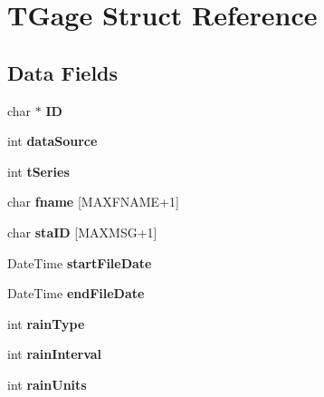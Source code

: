 \hypertarget{struct_t_gage}{}\section{T\+Gage Struct Reference}
\label{struct_t_gage}
\subsection*{Data Fields}
\begin{DoxyCompactItemize}
\item 
\mbox{\label{struct_t_gage_a63756a4a33a8c806e584babb52907653}} 
char $\ast$ {\bfseries ID}
\item 
\mbox{\label{struct_t_gage_a8c6e143881a82092996a7c55e51b2c2b}} 
int {\bfseries data\+Source}
\item 
\mbox{\label{struct_t_gage_a3de729b1c96053f3bd7fa21323bbb78c}} 
int {\bfseries t\+Series}
\item 
\mbox{\label{struct_t_gage_a7a1988c8e14a1fd6df9660f49c664e1e}} 
char {\bfseries fname} \mbox{[}M\+A\+X\+F\+N\+A\+ME+1\mbox{]}
\item 
\mbox{\label{struct_t_gage_a7a597995d0c6c3259bfd1b161666bfce}} 
char {\bfseries sta\+ID} \mbox{[}M\+A\+X\+M\+SG+1\mbox{]}
\item 
\mbox{\label{struct_t_gage_a79c0d4de77e74df8e771b2a268b4f763}} 
Date\+Time {\bfseries start\+File\+Date}
\item 
\mbox{\label{struct_t_gage_a183efe142d17284c5dd3b714999ec3b3}} 
Date\+Time {\bfseries end\+File\+Date}
\item 
\mbox{\label{struct_t_gage_a23c138e4466d4aefbda131c09b5fbac3}} 
int {\bfseries rain\+Type}
\item 
\mbox{\label{struct_t_gage_acd946bce6b233cbba9eafa53a438c921}} 
int {\bfseries rain\+Interval}
\item 
\mbox{\label{struct_t_gage_a7a00847ea4f63eac21efd269510a8904}} 
int {\bfseries rain\+Units}

\end{DoxyCompactItemize}
